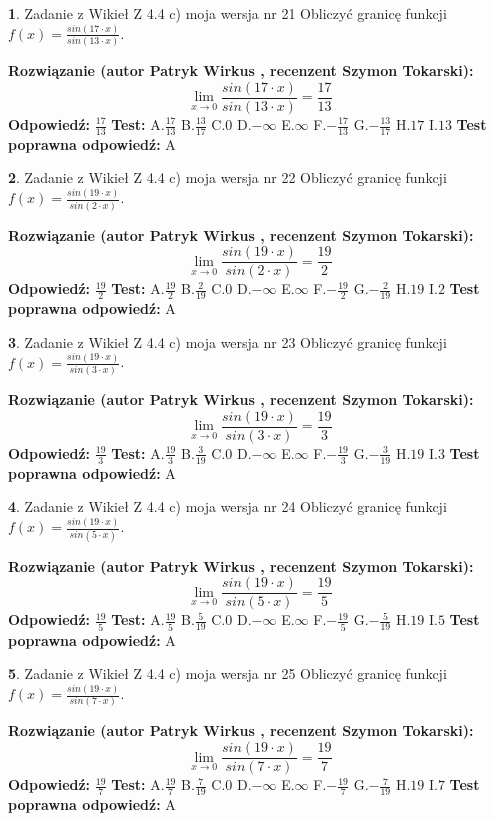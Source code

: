 \documentclass[12pt, a4paper]{article}
\theoremstyle{definition} %
\newtheorem{zad}{}
\newcommand{\zadStart}[1]{\begin{zad}#1\newline}
\newcommand{\zadStop}{\end{zad}}
\newcommand{\rozwStart}[2]{\noindent \textbf{Rozwiązanie (autor #1 , recenzent #2): }\newline}
\newcommand{\rozwStop}{\newline}
\newcommand{\odpStart}{\noindent \textbf{Odpowiedź:}\newline}
\newcommand{\odpStop}{\newline}
\newcommand{\testStart}{\noindent \textbf{Test:}\newline}
\newcommand{\testStop}{\newline}
\newcommand{\kluczStart}{\noindent \textbf{Test poprawna odpowiedź:}\newline}
\newcommand{\kluczStop}{\newline}
\begin{document}
\zadStart{Zadanie z Wikieł Z 4.4 c) moja wersja nr 21}
Obliczyć granicę funkcji $f(x)=\frac{sin(17\cdot x)}{sin(13\cdot x)}$.
\zadStop
\rozwStart{Patryk Wirkus}{Szymon Tokarski}
$$\lim\limits_{x\to 0}\frac{sin(17\cdot x)}{sin(13\cdot x)}=
\frac{17}{13}$$
\rozwStop
\odpStart
$\frac{17}{13}$
\odpStop
\testStart
A.$\frac{17}{13}$
B.$\frac{13}{17}$
C.$0$
D.$-\infty$
E.$\infty$
F.$-\frac{17}{13}$
G.$-\frac{13}{17}$
H.$17$
I.$13$
\testStop
\kluczStart
A
\kluczStop



\zadStart{Zadanie z Wikieł Z 4.4 c) moja wersja nr 22}
Obliczyć granicę funkcji $f(x)=\frac{sin(19\cdot x)}{sin(2\cdot x)}$.
\zadStop
\rozwStart{Patryk Wirkus}{Szymon Tokarski}
$$\lim\limits_{x\to 0}\frac{sin(19\cdot x)}{sin(2\cdot x)}=
\frac{19}{2}$$
\rozwStop
\odpStart
$\frac{19}{2}$
\odpStop
\testStart
A.$\frac{19}{2}$
B.$\frac{2}{19}$
C.$0$
D.$-\infty$
E.$\infty$
F.$-\frac{19}{2}$
G.$-\frac{2}{19}$
H.$19$
I.$2$
\testStop
\kluczStart
A
\kluczStop



\zadStart{Zadanie z Wikieł Z 4.4 c) moja wersja nr 23}
Obliczyć granicę funkcji $f(x)=\frac{sin(19\cdot x)}{sin(3\cdot x)}$.
\zadStop
\rozwStart{Patryk Wirkus}{Szymon Tokarski}
$$\lim\limits_{x\to 0}\frac{sin(19\cdot x)}{sin(3\cdot x)}=
\frac{19}{3}$$
\rozwStop
\odpStart
$\frac{19}{3}$
\odpStop
\testStart
A.$\frac{19}{3}$
B.$\frac{3}{19}$
C.$0$
D.$-\infty$
E.$\infty$
F.$-\frac{19}{3}$
G.$-\frac{3}{19}$
H.$19$
I.$3$
\testStop
\kluczStart
A
\kluczStop



\zadStart{Zadanie z Wikieł Z 4.4 c) moja wersja nr 24}
Obliczyć granicę funkcji $f(x)=\frac{sin(19\cdot x)}{sin(5\cdot x)}$.
\zadStop
\rozwStart{Patryk Wirkus}{Szymon Tokarski}
$$\lim\limits_{x\to 0}\frac{sin(19\cdot x)}{sin(5\cdot x)}=
\frac{19}{5}$$
\rozwStop
\odpStart
$\frac{19}{5}$
\odpStop
\testStart
A.$\frac{19}{5}$
B.$\frac{5}{19}$
C.$0$
D.$-\infty$
E.$\infty$
F.$-\frac{19}{5}$
G.$-\frac{5}{19}$
H.$19$
I.$5$
\testStop
\kluczStart
A
\kluczStop



\zadStart{Zadanie z Wikieł Z 4.4 c) moja wersja nr 25}
Obliczyć granicę funkcji $f(x)=\frac{sin(19\cdot x)}{sin(7\cdot x)}$.
\zadStop
\rozwStart{Patryk Wirkus}{Szymon Tokarski}
$$\lim\limits_{x\to 0}\frac{sin(19\cdot x)}{sin(7\cdot x)}=
\frac{19}{7}$$
\rozwStop
\odpStart
$\frac{19}{7}$
\odpStop
\testStart
A.$\frac{19}{7}$
B.$\frac{7}{19}$
C.$0$
D.$-\infty$
E.$\infty$
F.$-\frac{19}{7}$
G.$-\frac{7}{19}$
H.$19$
I.$7$
\testStop
\kluczStart
A
\kluczStop
\end{document}
